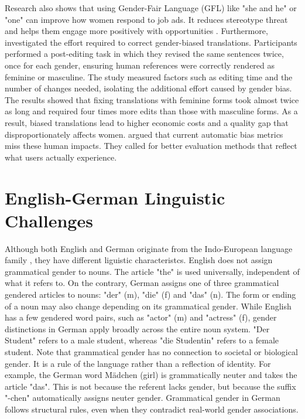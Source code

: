         Research also shows that using Gender-Fair Language (GFL) like "she and he" or "one" can improve how women respond to job ads. It reduces stereotype threat and helps them engage more positively with opportunities \parencite{godsilEffectsGenderRoles2016}. Furthermore, \textcite{savoldiWhatHarmQuantifying2024} investigated the effort required to correct gender-biased translations. Participants performed a post-editing task in which they revised the same sentences twice, once for each gender, ensuring human references were correctly rendered as feminine or masculine. The study measured factors such as editing time and the number of changes needed, isolating the additional effort caused by gender bias. The results showed that fixing translations with feminine forms took almost twice as long and required four times more edits than those with masculine forms. As a result, biased translations lead to higher economic costs and a quality gap that disproportionately affects women. \textcite{savoldiWhatHarmQuantifying2024} argued that current automatic bias metrics miss these human impacts. They called for better evaluation methods that reflect what users actually experience.

    \section{English-German Linguistic Challenges}
        Although both English and German originate from the Indo-European language family \parencite{baldiEnglishIndoEuropeanLanguage2008}, they have different liguistic characteristcs. English does not assign grammatical gender to nouns. The article "the" is used universally, independent of what it refers to. On the contrary, German assigns one of three grammatical gendered articles to nouns: "der" (m), "die" (f) and "das" (n). The form or ending of a noun may also change depending on its grammatical gender. While English has a few gendered word pairs, such as "actor" (m) and "actress" (f), gender distinctions in German apply broadly across the entire noun system. "Der Student" refers to a male student, whereas "die Studentin" refers to a female student. Note that grammatical gender has no connection to societal or biological gender. It is a rule of the language rather than a reflection of identity. For example, the German word Mädchen (girl) is grammatically neuter and takes the article "das". This is not because the referent lacks gender, but because the suffix "-chen" automatically assigns neuter gender. Grammatical gender in German follows structural rules, even when they contradict real-world gender associations.


